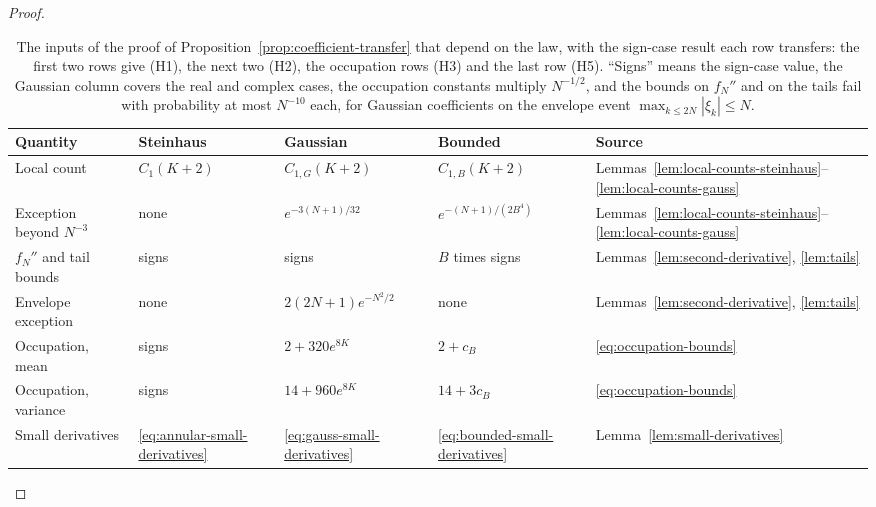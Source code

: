 \begin{proof}
\begin{table}[ht]
\centering
\small
\setlength{\tabcolsep}{4pt}
\begin{tabular}{@{}lllll@{}}
\toprule
Quantity & Steinhaus & Gaussian & Bounded & Source\\
\midrule
Local count & $C_1(K+2)$ & $C_{1,G}(K+2)$ & $C_{1,B}(K+2)$
 & Lemmas~\ref{lem:local-counts-steinhaus}--\ref{lem:local-counts-gauss}\\
Exception beyond $N^{-3}$ & none & $e^{-3(N+1)/32}$
 & $e^{-(N+1)/(2B^4)}$
 & Lemmas~\ref{lem:local-counts-steinhaus}--\ref{lem:local-counts-gauss}\\
$f_N''$ and tail bounds & signs & signs & $B$ times signs
 & Lemmas~\ref{lem:second-derivative}, \ref{lem:tails}\\
Envelope exception & none & $2(2N+1)e^{-N^2/2}$ & none
 & Lemmas~\ref{lem:second-derivative}, \ref{lem:tails}\\
Occupation, mean & signs & $2+320e^{8K}$ & $2+c_B$
 & \eqref{eq:occupation-bounds}\\
Occupation, variance & signs & $14+960e^{8K}$ & $14+3c_B$
 & \eqref{eq:occupation-bounds}\\
Small derivatives & \eqref{eq:annular-small-derivatives}
 & \eqref{eq:gauss-small-derivatives} & \eqref{eq:bounded-small-derivatives}
 & Lemma~\ref{lem:small-derivatives}\\
\bottomrule
\end{tabular}
\caption{The inputs of the proof of
Proposition~\ref{prop:coefficient-transfer} that depend on the law, with
the sign-case result each row transfers: the first two rows give (H1),
the next two (H2), the occupation rows (H3) and the last row (H5).
``Signs'' means the sign-case value, the Gaussian column covers the real
and complex cases, the occupation constants multiply $N^{-1/2}$, and the
bounds on $f_N''$ and on the tails fail with probability at most
$N^{-10}$ each, for Gaussian coefficients on the envelope event
$\max_{k\le2N}|\xi_k|\le N$.}
\label{tab:model-inputs}
\end{table}


\end{proof}
